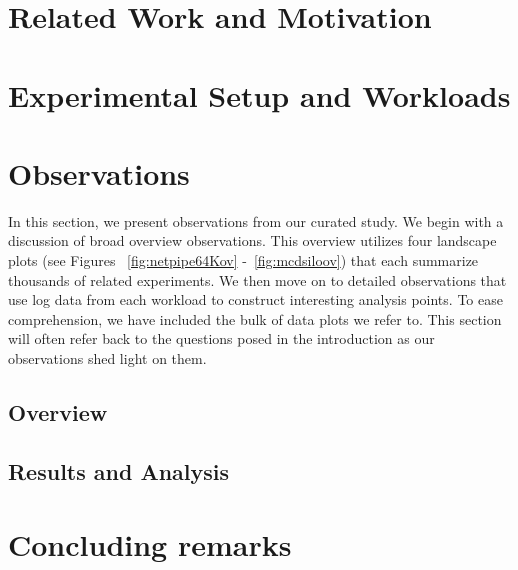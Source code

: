 \documentclass[letterpaper,twocolumn,10pt]{article}
\begin{document}
\section{Related Work and Motivation}


\section{Experimental Setup and Workloads}
\label{sec:exp}




%





\section{Observations}

In this section,
we present observations from our curated study.
We begin with a discussion of broad overview observations.
This overview utilizes four landscape plots (see Figures ~\ref{fig:netpipe64Kov} -~\ref{fig:mcdsiloov}) that each summarize thousands of related  experiments.
We then move on to detailed observations that use log data from each workload
to construct interesting analysis points.
To ease comprehension, we have included the bulk of data plots we refer to.  
This section will often refer back to the questions posed in the introduction
as our observations shed light on them.

\subsection{Overview}
\label{sec:resoverview}


\subsection{Results and Analysis}
\label{sec:analysis}


%
%
%

%

\section{Concluding remarks}



\newpage



\end{document}

